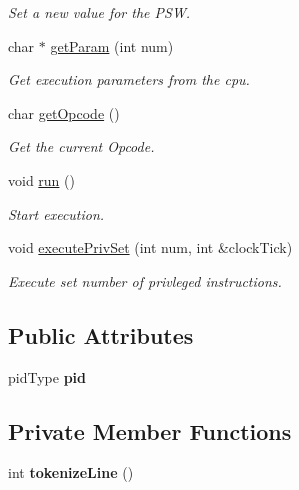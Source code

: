 \begin{DoxyCompactItemize}
\begin{DoxyCompactList}\small\item\em \-Set a new value for the \-P\-S\-W. \end{DoxyCompactList}\item 
char $\ast$ \hyperlink{classcCPU_a891d9b77e1818ca247e9d76f4db99415}{get\-Param} (int num)
\begin{DoxyCompactList}\small\item\em \-Get execution parameters from the cpu. \end{DoxyCompactList}\item 
char \hyperlink{classcCPU_a987e1ab511c71dcde48411f5bb16f9d8}{get\-Opcode} ()
\begin{DoxyCompactList}\small\item\em \-Get the current \-Opcode. \end{DoxyCompactList}\item 
void \hyperlink{classcCPU_aee300d68026ba9f13d5434ff82f0372a}{run} ()
\begin{DoxyCompactList}\small\item\em \-Start execution. \end{DoxyCompactList}\item 
void \hyperlink{classcCPU_a5d7b4d3ca9a197256dda6560072f036b}{execute\-Priv\-Set} (int num, int \&clock\-Tick)
\begin{DoxyCompactList}\small\item\em \-Execute set number of privleged instructions. \end{DoxyCompactList}\end{DoxyCompactItemize}
\subsection*{\-Public \-Attributes}
\begin{DoxyCompactItemize}
\item 
\hypertarget{classcCPU_abf8b9f3c8e99b0ea03d3051084f57dff}{pid\-Type {\bfseries pid}}\label{d2/dc6/classcCPU_abf8b9f3c8e99b0ea03d3051084f57dff}

\end{DoxyCompactItemize}
\subsection*{\-Private \-Member \-Functions}
\begin{DoxyCompactItemize}
\item 
\hypertarget{classcCPU_a62812ecc1a65c296fb4795b24b451f4e}{int {\bfseries tokenize\-Line} ()}\label{d2/dc6/classcCPU_a62812ecc1a65c296fb4795b24b451f4e}

\end{DoxyCompactItemize}
